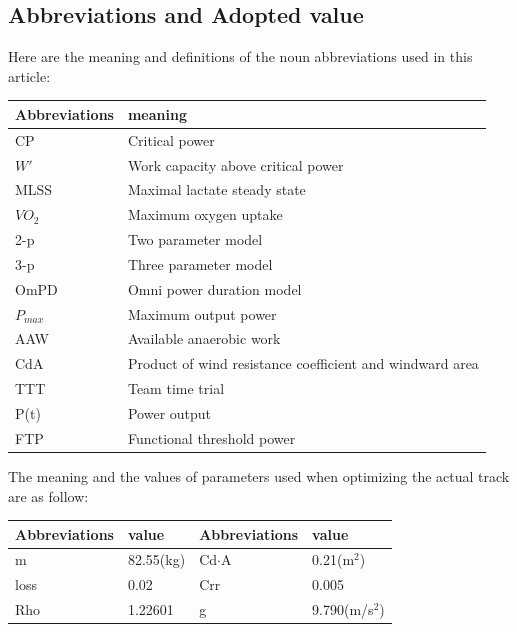 \documentclass{mcmthesis}
\begin{document}
\subsection{Abbreviations and Adopted value}
Here are the meaning and definitions of the noun abbreviations used in this article:
\begin{table}[H]
\centering
\begin{tabular}{ll}
\hline
Abbreviations & meaning\\
\hline
CP   & Critical power                         \\
${W}'$   & Work capacity above critical power \\
MLSS & Maximal lactate steady state           \\
$VO_2$  & Maximum oxygen uptake                  \\
2-p  & Two parameter model                    \\
3-p  & Three parameter model                  \\
OmPD & Omni power duration model              \\
$P_{max}$ & Maximum output power                   \\
AAW  & Available anaerobic work               \\
CdA & Product of wind resistance coefficient and windward area                                       \\
TTT & Team time trial                                       \\
P(t) & Power output                                       \\
FTP & Functional threshold power                                       \\
\hline                                 
\end{tabular}
\end{table}
\par
The meaning and the values of parameters used when optimizing the actual track are as follow:
\begin{table}[H]
\centering
\begin{tabular}{llll}
\hline
Abbreviations & value & Abbreviations &value \\
\hline
m   & 82.55(kg)  & Cd$\cdot$A & 0.21(m$^2$)             \\
loss   & 0.02  & Crr & 0.005 \\
Rho & 1.22601  & g & 9.790(m/s$^2$) \\
\hline                                 
\end{tabular}
\end{table}
\end{document}
